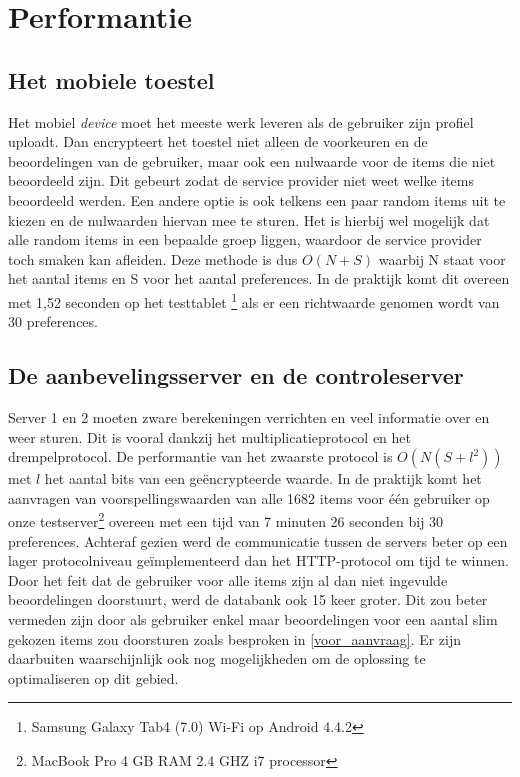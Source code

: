 \section{Performantie}
\subsection{Het mobiele toestel}
Het mobiel \emph{device} moet het meeste werk leveren als de gebruiker zijn profiel uploadt. Dan encrypteert het toestel niet alleen de voorkeuren en de beoordelingen van de gebruiker, maar ook een nulwaarde voor de items die niet beoordeeld zijn. Dit gebeurt zodat de service provider niet weet welke items beoordeeld werden. Een andere optie is ook telkens een paar random items uit te kiezen en de nulwaarden hiervan mee te sturen. Het is hierbij wel mogelijk dat alle random items in een bepaalde groep liggen, waardoor de service provider toch smaken kan afleiden. Deze methode is dus $O(N+S)$ waarbij N staat voor het aantal items en S voor het aantal preferences.
In de praktijk komt dit overeen met 1,52 seconden op het testtablet \footnote{Samsung Galaxy Tab4 (7.0) Wi-Fi op Android 4.4.2} als er een richtwaarde genomen wordt van 30 preferences. 

\subsection{De aanbevelingsserver en de controleserver}
Server 1 en 2 moeten zware berekeningen verrichten en veel informatie over en weer sturen. Dit is vooral dankzij het multiplicatieprotocol en het drempelprotocol. De performantie van het zwaarste protocol is $O(N(S+l^2))$ met $l$ het aantal bits van een ge\"encrypteerde waarde. In de praktijk komt het aanvragen van voorspellingswaarden van alle 1682 items voor \'e\'en gebruiker op onze testserver\footnote{MacBook Pro 4 GB RAM 2.4 GHZ i7 processor} overeen met een tijd van 7 minuten 26 seconden bij 30 preferences. Achteraf gezien werd de communicatie tussen de servers beter op een lager protocolniveau ge\"implementeerd dan het HTTP-protocol om tijd te winnen. Door het feit dat de gebruiker voor alle items zijn al dan niet ingevulde beoordelingen doorstuurt, werd de databank ook 15 keer groter. Dit zou beter vermeden zijn door als gebruiker enkel maar beoordelingen voor een aantal slim gekozen items zou doorsturen zoals besproken in \ref{voor_aanvraag}. Er zijn daarbuiten waarschijnlijk ook nog mogelijkheden om de oplossing te optimaliseren op dit gebied.